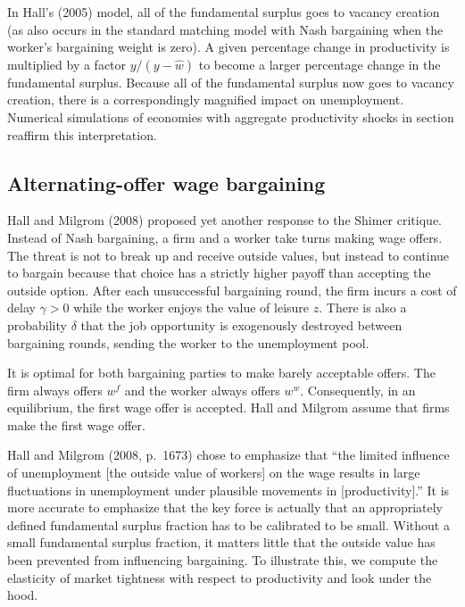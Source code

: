 In Hall's (2005) model, all
of the fundamental surplus goes to vacancy creation (as also occurs  in the
standard matching model with Nash
bargaining when  the worker's
bargaining weight is zero). A given percentage
change in productivity is multiplied  by a factor  \hbox{$y/(y-\hat w)$}
to become a larger percentage
change in the fundamental surplus.
Because all of the fundamental surplus now goes to vacancy creation, there
is a correspondingly magnified impact on unemployment. Numerical simulations of economies with aggregate
productivity shocks in section  reaffirm this interpretation.



\subsection{Alternating-offer wage bargaining}\label{sec:HallMilgrom}%
Hall and Milgrom (2008) proposed yet another response to the Shimer critique.
Instead of Nash bargaining, a firm and a worker take
turns making  wage offers. The threat is not to break
up and receive  outside values, but instead to continue to bargain
because that choice has a strictly higher payoff than accepting
the outside option. After each unsuccessful bargaining round, the
firm incurs a cost of delay $\gamma > 0$ while the worker enjoys
the value of leisure $z$. There is also a probability $\delta$ that
the job opportunity is exogenously destroyed between bargaining rounds, sending  the
worker to the unemployment pool.
%

It is optimal for both bargaining  parties  to make  barely
acceptable offers. The firm always offers $w^f$ and
the worker always offers $w^w$. Consequently, in an equilibrium, the
first wage offer is accepted. Hall and Milgrom assume that firms make the first
wage offer.

 Hall and Milgrom (2008, p.~1673)
chose to emphasize that ``the limited influence of unemployment
[the outside value of workers] on the wage results in large
fluctuations in unemployment under plausible movements in
[productivity].'' It is more accurate to emphasize
that  the key
force is actually  that an appropriately defined fundamental surplus fraction has to be
calibrated to be small. Without a small fundamental surplus
fraction, it matters little that the outside value has been
prevented  from influencing  bargaining. To  illustrate this, we  compute the
elasticity of market tightness with respect to productivity and look under the hood.

